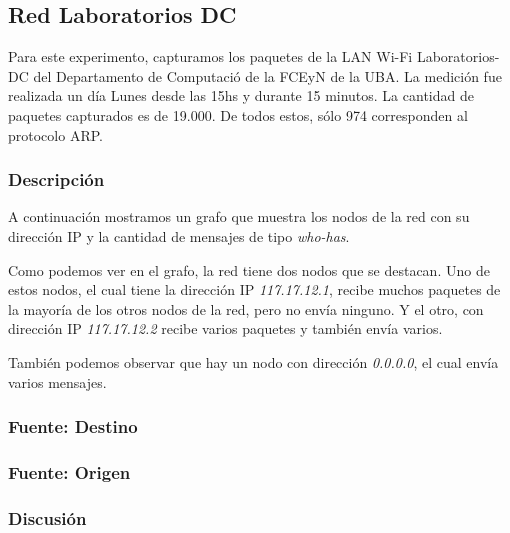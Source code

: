 \subsection{Red Laboratorios DC}

Para este experimento, capturamos los paquetes de la LAN Wi-Fi Laboratorios-DC del Departamento de Computació de la FCEyN de la UBA. La medición fue realizada un día Lunes desde las 15hs y durante 15 minutos. La cantidad de paquetes capturados es de 19.000. De todos estos, sólo 974 corresponden al protocolo ARP.

\subsubsection{Descripción}

A continuación mostramos un grafo que muestra los nodos de la red con su dirección IP y la cantidad de mensajes de tipo \emph{who-has}.


Como podemos ver en el grafo, la red tiene dos nodos que se destacan. Uno de estos nodos, el cual tiene la dirección IP \emph{117.17.12.1}, recibe muchos paquetes de la mayoría de los otros nodos de la red, pero no envía ninguno. Y el otro, con dirección IP \emph{117.17.12.2} recibe varios paquetes y también envía varios.

También podemos observar que hay un nodo con dirección \emph{0.0.0.0}, el cual envía varios mensajes. %

\subsubsection{Fuente: Destino}


\subsubsection{Fuente: Origen}



\subsubsection{Discusión}
